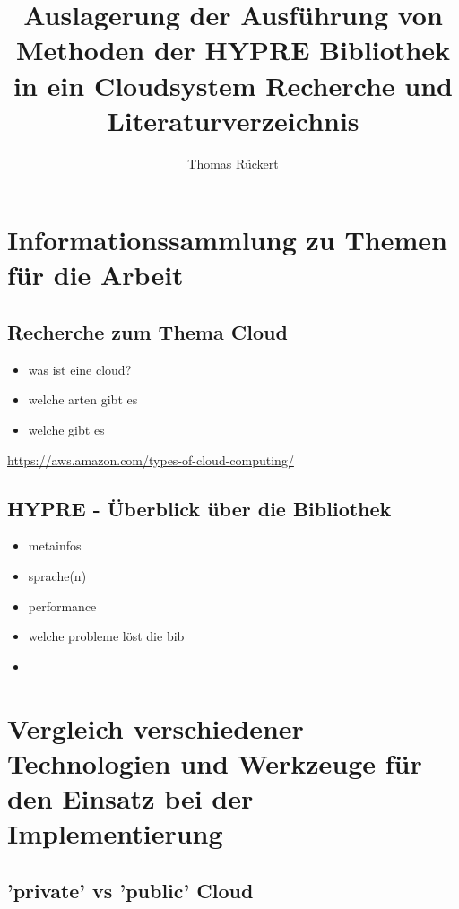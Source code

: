 \documentclass[a4paper,10pt]{article}
\title{Auslagerung der Ausführung von Methoden der HYPRE Bibliothek in ein Cloudsystem
Recherche und Literaturverzeichnis}
\author{Thomas Rückert}
\begin{document}
\maketitle
\newpage

\begin{abstract}

\end{abstract}

\newpage

\tableofcontents

\newpage

\section{Informationssammlung zu Themen für die Arbeit}
\subsection{Recherche zum Thema Cloud}

\begin{itemize}
 \item was ist eine cloud?
 \item welche arten gibt es
 \item welche gibt es
\end{itemize}

\url{https://aws.amazon.com/types-of-cloud-computing/}

\subsection{HYPRE - Überblick über die Bibliothek}

\begin{itemize}
 \item metainfos
 \item sprache(n)
 \item performance
 \item welche probleme löst die bib
 \item 
\end{itemize}

\newpage

\section{Vergleich verschiedener Technologien und Werkzeuge für den Einsatz bei der Implementierung}

\subsection{'private' vs 'public' Cloud}
\end{document}
